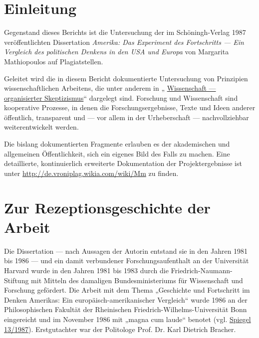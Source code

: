 \documentclass[ngerman,final,fontsize=12pt,paper=a4,twoside,bibliography=totoc,BCOR=8mm,draft=false]{scrartcl}
\begin{document}
\section{%
Einleitung}

Gegenstand dieses Berichts ist die Untersuchung der im Schöningh-Verlag 1987 veröffentlichten Dissertation %
\textit{Amerika: Das Experiment des Fortschritts --- Ein Vergleich des politischen Denkens in den USA und Europa} von Margarita Mathiopoulos auf Plagiatstellen. 


Geleitet wird die in diesem Bericht dokumentierte Untersuchung von Prinzipien wissenschaftlichen Arbeitens, die unter anderem in „%
\href{http://de.vroniplag.wikia.com/wiki/Wissenschaft_-_organisierter_Skeptizismus}{Wissenschaft --- organisierter Skeptizismus}“ dargelegt sind. Forschung und Wissenschaft sind kooperative Prozesse, in denen die Forschungsergebnisse, Texte und Ideen anderer öffentlich, transparent und --- vor allem in der Urheberschaft --- nachvollziehbar weiterentwickelt werden. 


Die bislang dokumentierten Fragmente erlauben es der akademischen und allgemeinen Öffentlichkeit, sich ein eigenes Bild des Falls zu machen. Eine detaillierte, kontinuierlich erweiterte Dokumentation der Projektergebnisse ist unter %
\url{http://de.vroniplag.wikia.com/wiki/Mm} zu finden. 

\section{%
Zur Rezeptionsgeschichte der Arbeit}

Die Dissertation --- nach Aussagen der Autorin entstand sie in den Jahren 1981 bis 1986 --- und ein damit verbundener Forschungsaufenthalt an der Universität Harvard wurde in den Jahren 1981 bis 1983 durch die Friedrich-Naumann-Stiftung mit Mitteln des damaligen Bundesministeriums für Wissenschaft und Forschung gefördert. Die Arbeit mit dem Thema „Geschichte und Fortschritt im Denken Amerikas: Ein europäisch-amerikanischer Vergleich“ wurde 1986 an der Philosophischen Fakultät der Rheinischen Friedrich-Wilhelms-Universität Bonn eingereicht und im November 1986 mit „magna cum laude“ benotet (vgl. %
\href{http://www.spiegel.de/spiegel/print/d-13522998.html}{Spiegel 13/1987}). Erstgutachter war der Politologe Prof. Dr. Karl Dietrich Bracher. 
\end{document}
